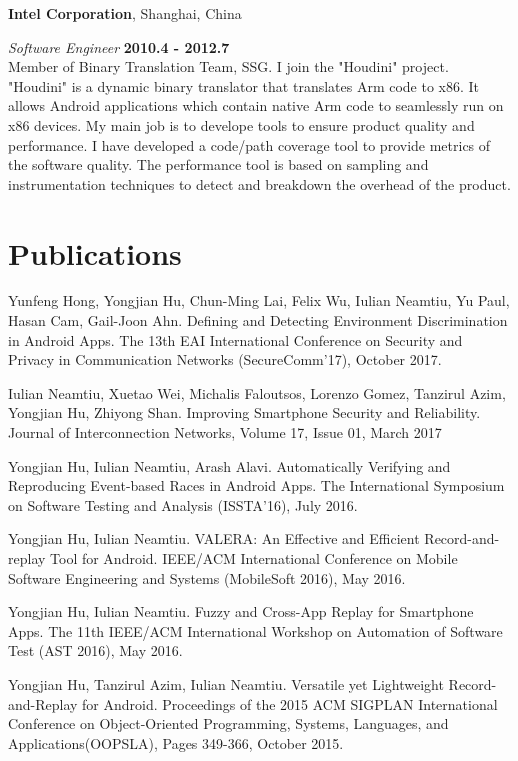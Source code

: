 \documentclass[margin,line]{res}
\begin{document}
\begin{resume}
\vspace{1.0cm}

{\bf Intel Corporation}, Shanghai, China

\vspace{-.3cm}
{\em Software Engineer} \hfill {\bf 2010.4 - 2012.7}\\
Member of Binary Translation Team, SSG. I join the "Houdini" project.
"Houdini" is a dynamic binary translator that translates Arm code to 
x86. It allows Android applications which contain native Arm code to 
seamlessly run on x86 devices. My main job is to develope tools to ensure 
product quality and performance. I have developed a code/path coverage 
tool to provide metrics of the software quality. The performance tool 
is based on sampling and instrumentation techniques to detect and 
breakdown the overhead of the product.


\section{\sc Publications}
Yunfeng Hong, Yongjian Hu, Chun-Ming Lai, Felix Wu, Iulian Neamtiu, Yu Paul, Hasan Cam, Gail-Joon Ahn.
Defining and Detecting Environment Discrimination in Android Apps.
The 13th EAI International Conference on Security and Privacy in Communication Networks (SecureComm'17), October 2017.

Iulian Neamtiu, Xuetao Wei, Michalis Faloutsos, Lorenzo Gomez, Tanzirul Azim, Yongjian Hu, Zhiyong Shan.
Improving Smartphone Security and Reliability.
Journal of Interconnection Networks, Volume 17, Issue 01, March 2017

Yongjian Hu, Iulian Neamtiu, Arash Alavi. Automatically Verifying and Reproducing Event-based Races in Android Apps.
The International Symposium on Software Testing and Analysis (ISSTA'16), July 2016.

Yongjian Hu, Iulian Neamtiu. VALERA: An Effective and Efficient Record-and-replay Tool for Android.
IEEE/ACM International Conference on Mobile Software Engineering and Systems (MobileSoft 2016), May 2016.

Yongjian Hu, Iulian Neamtiu. Fuzzy and Cross-App Replay for Smartphone Apps.
The 11th IEEE/ACM International Workshop on Automation of Software Test (AST 2016), May 2016.

Yongjian Hu, Tanzirul Azim, Iulian Neamtiu. Versatile yet Lightweight Record-and-Replay for Android.
Proceedings of the 2015 ACM SIGPLAN International Conference on Object-Oriented Programming, Systems, Languages, and Applications(OOPSLA),
Pages 349-366, October 2015.


\end{resume}
\end{document}
